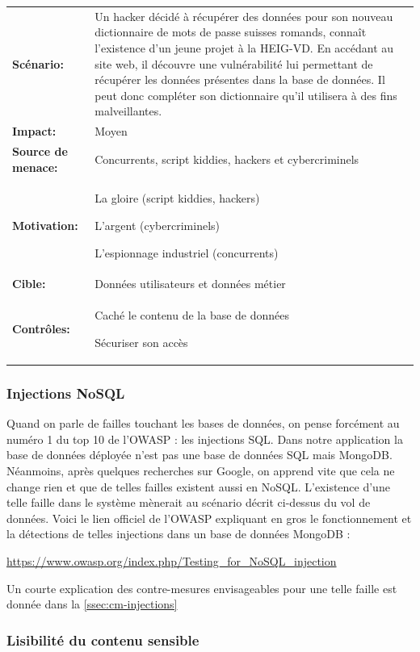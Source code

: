 \documentclass[12pt]{article}
\begin{document}
\renewcommand{\arraystretch}{1.6}
\begin{tabular}{@{}p{4cm}p{12cm}}
\textbf{Scénario:} &  Un hacker décidé à récupérer des données pour son nouveau dictionnaire de mots de passe suisses romands, connaît l'existence d'un jeune projet à la HEIG-VD. En accédant au site web, il découvre une vulnérabilité lui permettant de récupérer les données présentes dans la base de données. Il peut donc compléter son dictionnaire qu'il utilisera à des fins malveillantes. \\
\textbf{Impact:} & Moyen \\
\textbf{Source de menace: } & Concurrents, script kiddies, hackers et cybercriminels \\
\textbf{Motivation:} & La gloire (script kiddies, hackers)

L'argent (cybercriminels)

L'espionnage industriel (concurrents) \\
\textbf{Cible:} & Données utilisateurs et données métier \\
\textbf{Contrôles:} & Caché le contenu de la base de données

Sécuriser son accès
\end{tabular}
\renewcommand{\arraystretch}{1}

\subsubsection{Injections NoSQL}

Quand on parle de failles touchant les bases de données, on pense forcément au numéro 1 du top 10 de l'OWASP : les injections SQL. Dans notre application la base de données déployée n'est pas une base de données SQL mais MongoDB. Néanmoins, après quelques recherches sur Google, on apprend vite que cela ne change rien et que de telles failles existent aussi en NoSQL. L'existence d'une telle faille dans le système mènerait au scénario décrit ci-dessus du vol de données. Voici le lien officiel de l'OWASP expliquant en gros le fonctionnement et la détections de telles injections dans un base de données MongoDB : 

\url{https://www.owasp.org/index.php/Testing_for_NoSQL_injection}

Un courte explication des contre-mesures envisageables pour une telle faille est donnée dans la \autoref{ssec:cm-injections}

\subsubsection{Lisibilité du contenu sensible}
\end{document}
